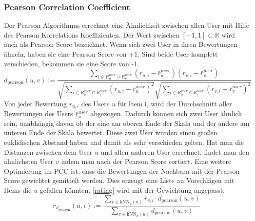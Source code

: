 \subsubsection{Pearson Correlation Coefficient}\label{s.pearson}
Der Pearson Algorithmus errechnet eine Ähnlichkeit zwischen allen User mit Hilfe des Pearson Korrelations Koeffizienten. Der Wert zwischen $[-1,1]\subset \mathbb{R}$ wird auch als Pearson Score bezeichnet. Wenn sich zwei User in ihren Bewertungen ähneln, haben sie eine Pearson Score von +1. Sind beide User komplett verschieden, bekommen sie eine Score von -1. 
\begin{equation}
	d_{\mathrm{pearson}}(u,v) := \dfrac{\sum\limits_{i \in R^{user}_{u}\cap R^{user}_{v}} (r_{u,i}-\bar{r}^{user}_{u})(r_{v,i}-\bar{r}^{user}_{v})}  {\sqrt{\sum\limits_{i \in R^{user}_{u}\cap R^{user}_{v}}(r_{u,i}-\bar{r}^{user}_{u})^2}\sqrt{\sum\limits_{i \in R^{user}_{u}\cap R^{user}_{v}}(r_{v,i}-\bar{r}^{user}_{v})^2}}
	 	\label{pccformula}
\end{equation}
Von jeder Bewertung $r_{u,i}$ des Users $u$ für Item i, wird der Durchschnitt aller Bewertungen des Users $\bar{r}^{user}_{u}$ abgezogen. Dadurch können sich zwei User ähnlich sein, unabhängig davon ob der eine am oberen Ende der Skala und der andere am unteren Ende der Skala bewertet.
Diese zwei User würden einen großen euklidischen Abstand haben und damit als sehr verschieden gelten. Hat man die Distanzen zwischen dem User $u$ und allen anderen User errechnet, findet man den ähnlichsten User $v$ indem man nach der Pearson Score sortiert. Eine weitere Optimierung im PCC ist, dass die Bewertungen der Nachbarn mit der Pearson-Score gewichtet gemittelt werden. Dies erzeugt eine Liste an Vorschlägen mit Items die $u$ gefallen könnten. \autoref{rating} wird mit der Gewichtung angepasst:
\begin{equation}
r_{d_{\mathrm{pearson}}}(u,i) := \dfrac{\sum\limits_{v \in \mathrm{kNN}_{d}(u)} r_{v,i}\cdot d_{\mathrm{pearson}}(u,v)}{\sum\limits_{v \in \mathrm{kNN}_{d}(u)}d_{\mathrm{pearson}}(u,v)}  
\label{pearsonrating}
\end{equation}

